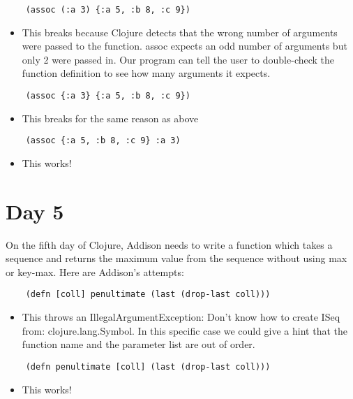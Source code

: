 \documentclass[12pt]{article}
\begin{document}
\begin{verbatim}
	(assoc (:a 3) {:a 5, :b 8, :c 9})
\end{verbatim}
\begin{itemize}
	\item This breaks because Clojure detects that the wrong number of arguments were passed to the function. assoc expects an odd number of arguments but only 2 were passed in. Our program can tell the user to double-check the function definition to see how many arguments it expects.
\end{itemize}

\begin{verbatim}
	(assoc {:a 3} {:a 5, :b 8, :c 9})
\end{verbatim}
\begin{itemize}
	\item This breaks for the same reason as above
\end{itemize}

\begin{verbatim}
	(assoc {:a 5, :b 8, :c 9} :a 3)
\end{verbatim}
\begin{itemize}
	\item This works!
\end{itemize}

\section{Day 5}
On the fifth day of Clojure, Addison needs to write a function which takes a sequence and returns the maximum value from the sequence without using max or key-max. Here are Addison's attempts:

\begin{verbatim}
	(defn [coll] penultimate (last (drop-last coll)))
\end{verbatim}
\begin{itemize}
	\item This throws an IllegalArgumentException: Don't know how to create ISeq from: clojure.lang.Symbol. In this specific case we could give a hint that the function name and the parameter list are out of order.
\end{itemize}

\begin{verbatim}
	(defn penultimate [coll] (last (drop-last coll)))
\end{verbatim}
\begin{itemize}
	\item This works!
\end{itemize}

\end{document}
